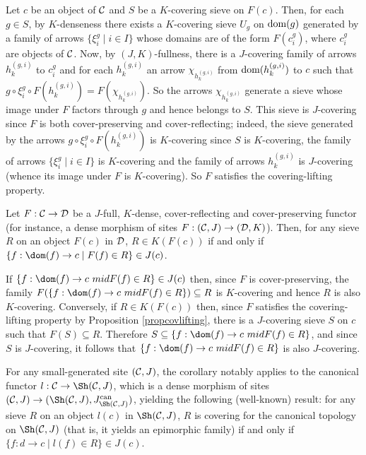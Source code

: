 \documentclass[a4paper,12pt]{article}
\begin{document}
\begin{proofs}
	Let $c$ be an object of $\cal C$ and $S$ be a $K$-covering sieve on $F(c)$. Then, for each $g\in S$, by $K$-denseness there exists a $K$-covering sieve $U_{g}$ on $\textup{dom}(g)$ generated by a family of arrows $\{\xi^{g}_{i} \mid i\in I \}$ whose domains are of the form $F(c^{g}_{i})$, where $c^{g}_{i}$ are objects of $\cal C$. Now, by $(J, K)$-fullness, there is a $J$-covering family of arrows $h^{(g, i)}_{k}$ to $c^{g}_{i}$ and for each $h^{(g, i)}_{k}$ an arrow $\chi_{h^{(g, i)}_{k}}$ from $\textup{dom}(h^{(g, i)}_{k})$ to $c$ such that $g\circ \xi^{g}_{i} \circ F(h^{(g, i)}_{k})= F(\chi_{h^{(g, i)}_{k}})$. So the arrows $\chi_{h^{(g, i)}_{k}}$ generate a sieve whose image under $F$ factors through $g$ and hence belongs to $S$. This sieve is $J$-covering since $F$ is both cover-preserving and cover-reflecting; indeed, the sieve generated by the arrows $g\circ \xi^{g}_{i} \circ F(h^{(g, i)}_{k})$ is $K$-covering since $S$ is $K$-covering, the family of arrows $\{\xi^{g}_{i} \mid i\in I \}$ is $K$-covering and the family of arrows $h^{(g, i)}_{k}$ is $J$-covering (whence its image under $F$ is $K$-covering). So $F$ satisfies the covering-lifting property.     	
\end{proofs}

\begin{corollary}
	Let $F:{\cal C}\to {\cal D}$ be a $J$-full, $K$-dense, cover-reflecting and cover-preserving functor (for instance, a dense morphism of sites $F:({\cal C}, J)\to ({\cal D}, K)$). Then, for any sieve $R$ on an object $F(c)$ in $\cal D$, $R\in K(F(c))$ if and only if $\{f:\dom(f)\to c \mid F(f)\in R\}\in J(c)$.  
\end{corollary}

\begin{proofs}
If 	$\{f:\dom(f)\to c\ mid F(f)\in R\}\in J(c)$ then, since $F$ is cover-preserving, the family $F(\{f:\dom(f)\to c\ mid F(f)\in R\})\subseteq R$ is $K$-covering and hence $R$ is also $K$-covering. Conversely, if $R\in K(F(c))$ then, since $F$ satisfies the covering-lifting property by Proposition \ref{propcovlifting}, there is a $J$-covering sieve $S$ on $c$ such that $F(S)\subseteq R$. Therefore $S\subseteq \{f:\dom(f)\to c\ mid F(f)\in R\}$, and since $S$ is $J$-covering, it follows that $\{f:\dom(f)\to c\ mid F(f)\in R\}$ is also $J$-covering.  
\end{proofs}


\begin{remark}
	For any small-generated site $({\cal C}, J)$, the corollary notably applies to the canonical functor $l:{\cal C}\to \Sh({\cal C}, J)$, which is a dense morphism of sites $({\cal C}, J)\to (\Sh({\cal C}, J), J^{\textup{can}}_{\Sh({\cal C}, J)})$, yielding the following (well-known) result: for any sieve $R$ on an object $l(c)$ in $\Sh({\cal C}, J)$, $R$ is covering for the canonical topology on $\Sh({\cal C}, J)$ (that is, it yields an epimorphic family) if and only if $\{f:d\to c \mid l(f)\in R\}\in J(c)$.		
\end{remark}
\end{document}
